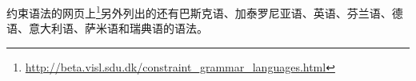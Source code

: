 \begin{itemize}
\end{itemize}
约束语法的网页上\footnote{%
  \url{http://beta.visl.sdu.dk/constraint_grammar_languages.html}
}另外列出的还有巴斯克语、加泰罗尼亚语、英语、芬兰语、德语、意大利语、萨米语和瑞典语的语法。
%
